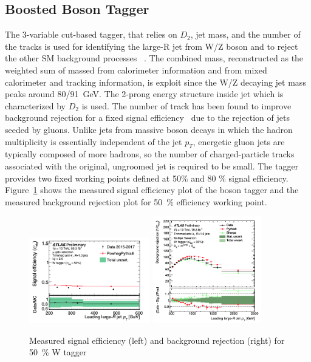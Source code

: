 \subsection{Boosted Boson Tagger}
The 3-variable cut-based tagger, that relies on $D_2$, jet mass, and the number of the tracks is used for identifying the large-R jet from W/Z boson and to reject the other SM background processes~\cite{ATL-PHYS-PUB-2020-017} . 
The combined mass, reconstructed as the weighted sum of massed from calorimeter information and from mixed calorimeter and tracking information, is exploit since the W/Z decaying jet mass peaks around 80/91~GeV. 
The 2-prong energy structure inside jet which is characterized by $D_2$ is used.
The number of track has been found to improve background rejection for a fixed signal efficiency~\cite{EXOT-2013-08} due to the rejection of jets seeded by gluons.  
Unlike jets from massive boson decays in which the hadron multiplicity is essentially independent of the jet $p_T$, energetic gluon jets are typically composed of more hadrons, so the number of charged-particle tracks associated with the original, ungroomed jet is required to be small. 
The tagger provides two fixed working points defined at 50\% and 80 \% signal efficiency. 
Figure~\ref{fig:bosonTagger} shows the measured signal efficiency plot of the boson tagger and the measured background rejection plot for 50~\% efficiency working point.
\begin{figure}[tbp]
    \begin{center}
    \includegraphics[width=0.47\textwidth,keepaspectratio]{figures/Reconstruction/bosontaggersignaleff}
    \includegraphics[width=0.42\textwidth,keepaspectratio]{figures/Reconstruction/bosontaggerrejection}
    \caption{
     Measured signal efficiency (left) and background rejection (right) for 50~\% W tagger \cite{ATL-PHYS-PUB-2020-017}
    }
    \label{fig:bosonTagger}
    \end{center}
\end{figure}

